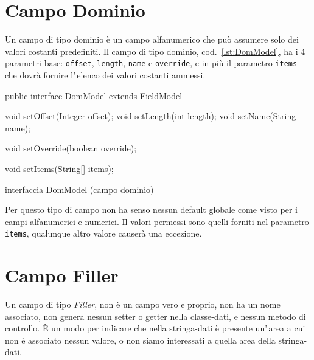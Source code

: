 \documentclass[a4paper,10pt]{report}
\newif\ifesource
\newenvironment{elisting}[1][H]
  {\captionsetup{aboveskip=0pt}\begin{listing}[#1]}
  {\end{listing}%
}
\begin{document}
\section{Campo Dominio}
Un campo di tipo dominio è un campo alfanumerico che può assumere solo dei 
valori costanti predefiniti.
Il campo di tipo dominio, cod.~\ref{lst:DomModel}, ha i 4 parametri base: 
\verb!offset!, \verb!length!, \verb!name! e \verb!override!, e in più il 
parametro \verb!items! che dovrà fornire l'\,elenco dei valori costanti ammessi.

\ifesource
\begin{figure*}[!htb]
\begin{lstlisting}[language=java, 
caption=interfaccia DomModel (campo dominio), 
label=lst:DomModel]
public interface DomModel extends FieldModel {
    void setOffset(Integer offset);
    void setLength(int length);
    void setName(String name);
    
    void setOverride(boolean override);
    
    void setItems(String[] items);
}
\end{lstlisting}\index{DomModel}
\end{figure*}
\else
\begin{elisting}[!htb]
\begin{javacode}
public interface DomModel extends FieldModel {
    void setOffset(Integer offset);
    void setLength(int length);
    void setName(String name);
    
    void setOverride(boolean override);
    
    void setItems(String[] items);
}
\end{javacode}
\caption{interfaccia DomModel (campo dominio)}
\label{lst:DomModel}
\end{elisting}
\fi

Per questo tipo di campo non ha senso nessun default globale come visto per i
campi alfanumerici e numerici. Il valori permessi sono quelli forniti nel 
parametro \verb!items!, qualunque altro valore causerà una eccezione.

\section{Campo Filler}
Un campo di tipo \textsl{Filler}, non è un campo vero e proprio, non ha un nome 
associato, non genera nessun setter o getter nella classe-dati, e nessun metodo
di controllo. È un modo per indicare che nella stringa-dati è presente un'\,area
a cui non è associato nessun valore, o non siamo interessati a quella area della
stringa-dati.
\end{document}
